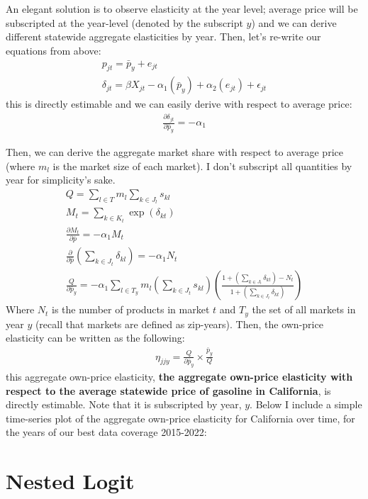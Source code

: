 \documentclass{article}
\begin{document}
An elegant solution is to observe elasticity at the year level; average price will be subscripted at the year-level (denoted by the subscript $y$) and we can derive different statewide aggregate elasticities by year. Then, let's re-write our equations from above:
\begin{gather}
	p_{jt} = \bar{p}_y + e_{jt} \\
	\delta_{jt} = \beta X_{jt} - \alpha_1 (\bar{p}_y) + \alpha_2 (e_{jt}) + \epsilon_{jt}
\end{gather}
this is directly estimable and we can easily derive with respect to average price:
\begin{gather}
	\frac{\partial \delta_{jt}}{\partial \bar{p}_y} = - \alpha_1
\end{gather}

Then, we can derive the aggregate market share with respect to average price (where $m_l$ is the market size of each market). I don't subscript all quantities by year for simplicity's sake.
\begin{gather}
	Q = \sum_{l \in T} m_l \sum_{k \in J_l} s_{k l} \\ 
	M_t = \sum_{k \in K_t} \exp(\delta_{kt}) \\ 
	\frac{\partial M_t}{\partial \bar{p}} = -\alpha_1 M_t \\
	\frac{\partial}{\partial \bar{p}} (\sum_{k \in J_t} \delta_{kl}) = -\alpha_1 N_t \\
	\frac{Q}{\partial \bar{p}_y} = -\alpha_1 \sum_{l \in T_y} m_l (\sum_{k \in J_t} s_{kl})(\frac{1 + (\sum_{k \in J_t} \delta_{kt}) - N_t}{1 + (\sum_{k \in J_t} \delta_{kt})})
\end{gather}
Where $N_t$ is the number of products in market $t$ and $T_y$ the set of all markets in year $y$ (recall that markets are defined as zip-years). Then, the own-price elasticity can be written as the following:
\begin{gather}
	\eta_{jjy} = \frac{Q}{\partial \bar{p}_y} \times \frac{\bar{p}_y}{Q}
\end{gather}
this aggregate own-price elasticity, \textbf{the aggregate own-price elasticity with respect to the average statewide price of gasoline in California}, is directly estimable. Note that it is subscripted by year, $y$. Below I include a simple time-series plot of the aggregate own-price elasticity for California over time, for the years of our best data coverage 2015-2022:

\section{Nested Logit}
\end{document}
